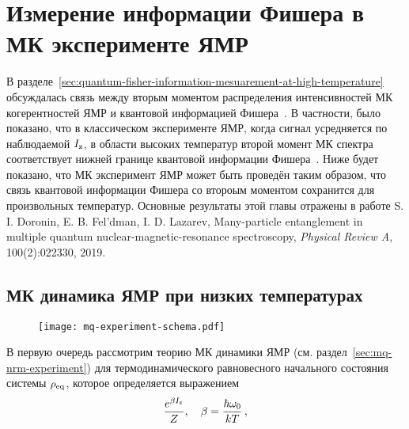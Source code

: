 \chapter{Измерение информации Фишера в МК эксперименте ЯМР}
\label{chapter:quantum-fisher-information-measurement}

В разделе~\ref{sec:quantum-fisher-information-mesuarement-at-high-temperature}
обсуждалась связь между вторым моментом распределения интенсивностей МК когерентностей ЯМР и квантовой информацией Фишера~\cite{Toth2014,Pezze2018}.
В частности, было показано,
что в классическом эксперименте ЯМР, когда сигнал усредняется по наблюдаемой $I_\mathrm{z}$, в области высоких температур второй момент МК спектра соответствует нижней границе квантовой информации Фишера~\cite{Garttner2018}.
Ниже будет показано, что МК эксперимент ЯМР может быть проведён таким образом,
что связь квантовой информации Фишера со второым моментом сохранится для произвольных температур. 
Основные результаты этой главы отражены в работе 
S. I. Doronin, E. B. Fel'dman,  I. D. Lazarev, Many-particle entanglement in multiple quantum nuclear-magnetic-resonance spectroscopy, \textit{Physical Review A}, 100(2):022330, 2019. 


\section{МК динамика ЯМР при низких температурах}
\begin{figure}[H]
  \centering
  \texttt{[image: mq-experiment-schema.pdf]}
  \caption{\protect}
  \label{fig:mq-experiment-schema}
\end{figure}

В первую очередь рассмотрим теорию МК динамики ЯМР (см. раздел~\ref{sec:mq-nrm-experiment})
для термодинамического равновесного начального состояния системы $\rho_\mathrm{eq}$,
которое определяется выражением
%
\begin{equation}\label{eq:rho_eq}
  \dfrac{e^{\beta I_\mathrm{z}}}{Z}, \quad \beta = \frac{\hbar\omega_{0}}{kT} \, ,
\end{equation}
%
\rhoEqExplanatoryNote

